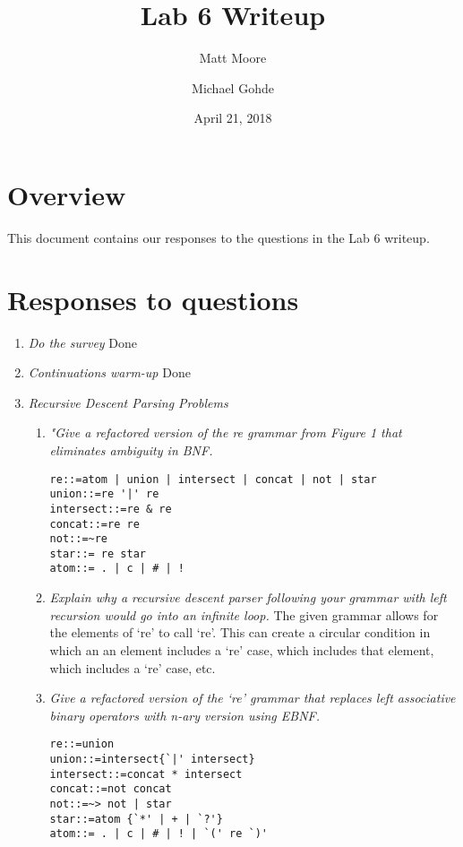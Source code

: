 \documentclass[12pt,letterpaper]{article}
\begin{document}
\title{Lab 6 Writeup}
\author{Matt Moore}
\author{Michael Gohde}
\date{April 21, 2018}
\maketitle

\section{Overview}
This document contains our responses to the questions in the Lab 6 writeup.

\section{Responses to questions}
\begin{enumerate}
\item \textit{Do the survey}
Done

\item \textit{Continuations warm-up}
Done

\item \textit{Recursive Descent Parsing Problems}
\begin{enumerate}
\item \textit{"Give a refactored version of the re grammar from Figure 1 that eliminates ambiguity in BNF.}
\begin{verbatim}
re::=atom | union | intersect | concat | not | star
union::=re '|' re
intersect::=re & re
concat::=re re
not::=~re
star::= re star
atom::= . | c | # | !
\end{verbatim}

\item \textit{Explain why a recursive descent parser following your grammar with left recursion would go into an infinite loop.}
The given grammar allows for the elements of `re' to call `re'. This can create a circular condition in which an an element includes a `re' case, which includes that element, which includes a `re' case, etc.

\item \textit{Give a refactored version of the `re' grammar that replaces left associative binary operators with n-ary version using EBNF.}
\begin{verbatim}
re::=union
union::=intersect{`|' intersect}
intersect::=concat * intersect
concat::=not concat
not::=~> not | star
star::=atom {`*' | + | `?'}
atom::= . | c | # | ! | `(' re `)'
\end{verbatim}


\end{enumerate}
\end{enumerate}
\end{document}
